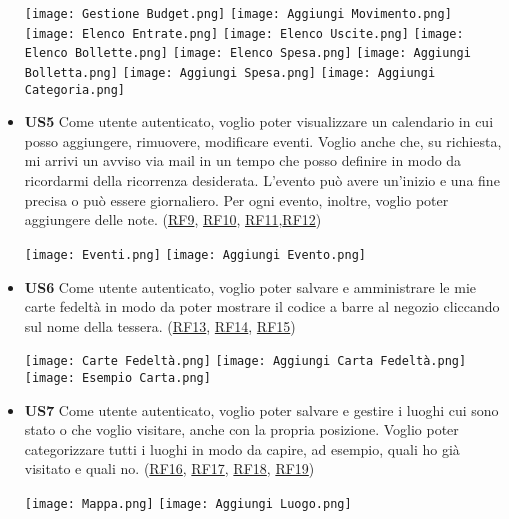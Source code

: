 \documentclass[a4paper,12pt]{article}
\begin{document}
\begin{itemize}
\begin{center}
  \texttt{[image: Gestione Budget.png]}
  \texttt{[image: Aggiungi Movimento.png]}
  \texttt{[image: Elenco Entrate.png]}
  \texttt{[image: Elenco Uscite.png]}
  \texttt{[image: Elenco Bollette.png]}
  \texttt{[image: Elenco Spesa.png]}
  \texttt{[image: Aggiungi Bolletta.png]}
  \texttt{[image: Aggiungi Spesa.png]}
  \texttt{[image: Aggiungi Categoria.png]}
\end{center}

\item \textbf {US5}  Come utente autenticato, voglio poter visualizzare un calendario in cui posso aggiungere, rimuovere, modificare eventi. Voglio anche che, su richiesta, mi arrivi un avviso via mail in un tempo che posso definire in modo da ricordarmi della ricorrenza desiderata. L'evento può avere un'inizio e una fine precisa o può essere giornaliero. Per ogni evento, inoltre, voglio poter aggiungere delle note. (\hyperlink{RF9}{RF9}, \hyperlink{RF10}{RF10}, \hyperlink{RF11}{RF11},\hyperlink{RF12}{RF12})

\begin{center}
  \texttt{[image: Eventi.png]}
  \texttt{[image: Aggiungi Evento.png]}
\end{center}

\item \textbf {US6} Come utente autenticato, voglio poter salvare e amministrare le mie carte fedeltà in modo da poter mostrare il codice a barre al negozio cliccando sul nome della tessera. (\hyperlink{RF13}{RF13}, \hyperlink{RF14}{RF14}, \hyperlink{RF15}{RF15})

\begin{center}
  \texttt{[image: Carte Fedeltà.png]}
  \texttt{[image: Aggiungi Carta Fedeltà.png]}
  \texttt{[image: Esempio Carta.png]}
\end{center}

\item \textbf {US7} Come utente autenticato, voglio poter salvare e gestire i luoghi cui sono stato o che voglio visitare, anche con la propria posizione. Voglio poter categorizzare tutti i luoghi in modo da capire, ad esempio, quali ho già visitato e quali no. (\hyperlink{RF16}{RF16}, \hyperlink{RF17}{RF17}, \hyperlink{RF18}{RF18}, \hyperlink{RF19}{RF19})

\begin{center}
  \texttt{[image: Mappa.png]}
  \texttt{[image: Aggiungi Luogo.png]}
\end{center}


\end{itemize}
\end{document}
